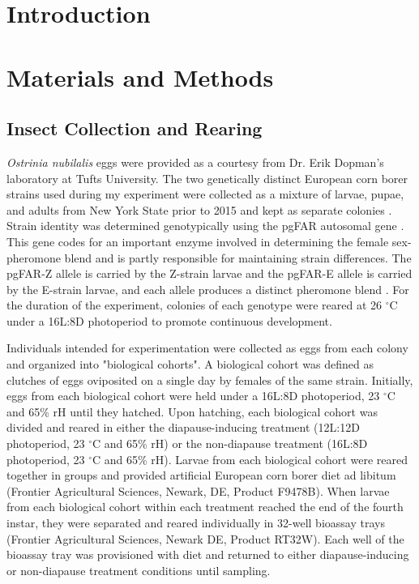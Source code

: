 \documentclass[review]{elsarticle}
\begin{document}
\linenumbers

\section{Introduction}

\section{Materials and Methods}
\subsection{Insect Collection and Rearing}
\textit{Ostrinia nubilalis} eggs were provided as a courtesy from Dr. Erik Dopman's laboratory at Tufts University. The two genetically distinct European corn borer strains used during my experiment were collected as a mixture of larvae, pupae, and adults from New York State prior to 2015 and kept as separate colonies \citep{Wadsworth2015}. Strain identity was determined genotypically using the pgFAR autosomal gene \citep{Lassance2010}. This gene codes for an important enzyme involved in determining the female sex-pheromone blend and is partly responsible for maintaining strain differences. The pgFAR-Z allele is carried by the Z-strain larvae and the pgFAR-E allele is carried by the E-strain larvae, and each allele produces a distinct pheromone blend \citep{Lassance2010}. For the duration of the experiment, colonies of each genotype were reared at 26 $^\circ$C  under a 16L:8D photoperiod to promote continuous development. 

Individuals intended for experimentation were collected as eggs from each colony and organized into "biological cohorts". A biological cohort was defined as clutches of eggs oviposited on a single day by females of the same strain. Initially, eggs from each biological cohort were held under a 16L:8D photoperiod, 23 $^\circ$C and 65\% rH until they hatched. Upon hatching, each biological cohort was divided and reared in either the diapause-inducing treatment (12L:12D photoperiod, 23 $^\circ$C and 65\% rH) or the non-diapause treatment (16L:8D photoperiod, 23 $^\circ$C and 65\% rH). Larvae from each biological cohort were reared together in groups and provided artificial European corn borer diet ad libitum (Frontier Agricultural Sciences, Newark, DE, Product F9478B). When larvae from each biological cohort within each treatment reached the end of the fourth instar, they were separated and reared individually in 32-well bioassay trays (Frontier Agricultural Sciences, Newark DE, Product RT32W). Each well of the bioassay tray was provisioned with diet and returned to either diapause-inducing or non-diapause treatment conditions until sampling.
\end{document}
